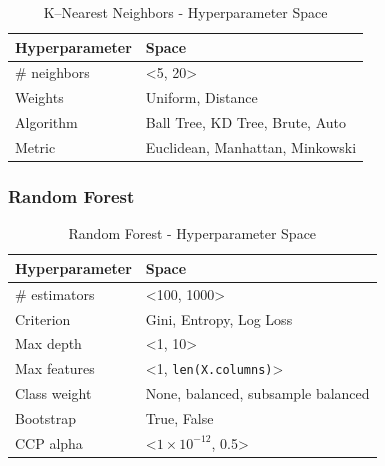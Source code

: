 \begin{table}[H]
\small
\setlength{\tabcolsep}{8pt}
\renewcommand{\arraystretch}{1.3}
\centering
    \caption[K--Nearest Neighbors - Hyperparameter Space]{K--Nearest Neighbors - Hyperparameter Space}\label{tab:knnspace}
    \begin{tabular}{ll}
\toprule
\textbf{Hyperparameter} & \textbf{Space}\\
\midrule
\hline
\# neighbors & <5, 20> \\
Weights & Uniform, Distance \\
Algorithm & Ball Tree, KD Tree, Brute, Auto \\
Metric & Euclidean, Manhattan, Minkowski \\
\hline
\bottomrule
\end{tabular}
\vspace{0.7em}

\vspace{-1em}
\end{table}

\subsubsection{Random Forest}

\begin{table}[H]
\small
\setlength{\tabcolsep}{8pt}
\renewcommand{\arraystretch}{1.3}
\centering
    \caption[Random Forest - Hyperparameter Space]{Random Forest - Hyperparameter Space}\label{tab:rfspace}
    \begin{tabular}{ll}
\toprule
\textbf{Hyperparameter} & \textbf{Space}\\
\midrule
\hline
\# estimators & <100, 1000> \\
Criterion & Gini, Entropy, Log Loss \\
Max depth & <1, 10> \\
Max features & <1, \verb|len(X.columns)|>  \\
Class weight & None, balanced, subsample balanced \\
Bootstrap & True, False \\
CCP alpha & <$1 \times 10^{-12}$, 0.5> \\
\hline
\bottomrule
\end{tabular}
\vspace{0.7em}

\vspace{-1em}
\end{table}

